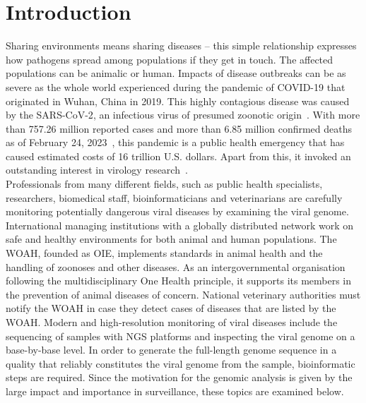 \chapter{Introduction}\label{chap:introduction}
Sharing environments means sharing diseases -- this simple relationship expresses how pathogens spread among populations if they get in touch. The affected populations can be animalic or human. Impacts of disease outbreaks can be as severe as the whole world experienced during the pandemic of \ac{COVID-19} that originated in Wuhan, China in 2019. This highly contagious disease was caused by the \ac{SARS-CoV-2}, an infectious virus of presumed zoonotic origin~\cite{wu2020new}. With more than 757.26 million reported cases and more than 6.85 million confirmed deaths as of February 24, 2023~, this pandemic is a public health emergency that has caused estimated costs of 16 trillion U.S. dollars. Apart from this, it invoked an outstanding interest in virology research~\cite{covid}. \\
Professionals from many different fields, such as public health specialists, researchers, biomedical staff, bioinformaticians and veterinarians are carefully monitoring potentially dangerous viral diseases by examining the viral genome. International managing institutions with a globally distributed network work on safe and healthy environments for both animal and human populations. The \ac{WOAH}, founded as \ac{OIE}, implements standards in animal health and the handling of zoonoses and other diseases. As an intergovernmental organisation following the multidisciplinary One Health principle, it supports its members in the prevention of animal diseases of concern. National veterinary authorities must notify the \ac{WOAH} in case they detect cases of diseases that are listed by the \ac{WOAH}. Modern and high-resolution monitoring of viral diseases include the sequencing of samples with \ac{NGS} platforms and inspecting the viral genome on a base-by-base level. In order to generate the full-length genome sequence in a quality that reliably constitutes the viral genome from the sample, bioinformatic steps are required. Since the motivation for the genomic analysis is given by the large impact and importance in surveillance,
these topics are examined below.

